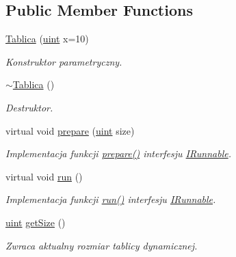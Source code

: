 \subsection*{Public Member Functions}
\begin{DoxyCompactItemize}
\item 
\hyperlink{class_tablica_a3ebc24ff90be6556ec0c0fa87f354c81}{Tablica} (\hyperlink{_i_lista_8h_a91ad9478d81a7aaf2593e8d9c3d06a14}{uint} x=10)
\begin{DoxyCompactList}\small\item\em Konstruktor parametryczny. \end{DoxyCompactList}\item 
\hyperlink{class_tablica_aa41eb34f825167e33916793c807087ec}{$\sim$\-Tablica} ()
\begin{DoxyCompactList}\small\item\em Destruktor. \end{DoxyCompactList}\item 
virtual void \hyperlink{class_tablica_ac54e8c5dcbd665dcf48d10b9df8ff41b}{prepare} (\hyperlink{_i_lista_8h_a91ad9478d81a7aaf2593e8d9c3d06a14}{uint} size)
\begin{DoxyCompactList}\small\item\em Implementacja funkcji \hyperlink{class_tablica_ac54e8c5dcbd665dcf48d10b9df8ff41b}{prepare()} interfesju \hyperlink{class_i_runnable}{I\-Runnable}. \end{DoxyCompactList}\item 
virtual void \hyperlink{class_tablica_a0e9570529b80cc6e1b40bf8b0d7e55c1}{run} ()
\begin{DoxyCompactList}\small\item\em Implementacja funkcji \hyperlink{class_tablica_a0e9570529b80cc6e1b40bf8b0d7e55c1}{run()} interfesju \hyperlink{class_i_runnable}{I\-Runnable}. \end{DoxyCompactList}\item 
\hyperlink{_i_lista_8h_a91ad9478d81a7aaf2593e8d9c3d06a14}{uint} \hyperlink{class_tablica_ac3341812852356aa941c7077f7dfcfd7}{get\-Size} ()
\begin{DoxyCompactList}\small\item\em Zwraca aktualny rozmiar tablicy dynamicznej. \end{DoxyCompactList}\end{DoxyCompactItemize}
